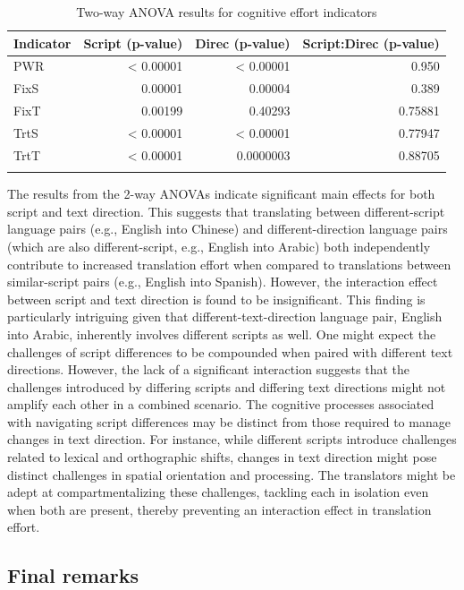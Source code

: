 \documentclass[output=paper]{langscibook}
\begin{document}
\begin{table}
\begin{tabularx}{\textwidth}{Xrrr}
\lsptoprule
{Indicator} & {Script (p-value)} & {Direc (p-value)} & {Script:Direc (p-value)}\\
\midrule
{PWR} & < 0.00001 & < 0.00001 & 0.950\\
{FixS} & 0.00001 & 0.00004 & 0.389\\
{FixT} & 0.00199 & 0.40293 & 0.75881\\
{TrtS} & < 0.00001 & < 0.00001 & 0.77947\\
{TrtT} & < 0.00001 & 0.0000003 & 0.88705\\
\lspbottomrule
\end{tabularx}
\caption{\label{tab:saedi:4}Two-way ANOVA results for cognitive effort indicators}
\end{table}

The results from the 2-way ANOVAs indicate significant main effects for both script and text direction. This suggests that translating between different-script language pairs (e.g., English into Chinese) and different-direction language pairs (which are also different-script, e.g., English into Arabic) both independently contribute to increased translation effort when compared to translations between similar-script pairs (e.g., English into Spanish). However, the interaction effect between script and text direction is found to be insignificant. This finding is particularly intriguing given that different-text-direction language pair, English into Arabic, inherently involves different scripts as well. One might expect the challenges of script differences to be compounded when paired with different text directions. However, the lack of a significant interaction suggests that the challenges introduced by differing scripts and differing text directions might not amplify each other in a combined scenario. The cognitive processes associated with navigating script differences may be distinct from those required to manage changes in text direction. For instance, while different scripts introduce challenges related to lexical and orthographic shifts, changes in text direction might pose distinct challenges in spatial orientation and processing. The translators might be adept at compartmentalizing these challenges, tackling each in isolation even when both are present, thereby preventing an interaction effect in translation effort.

\subsection{{Final}  {remarks}}
\end{document}
